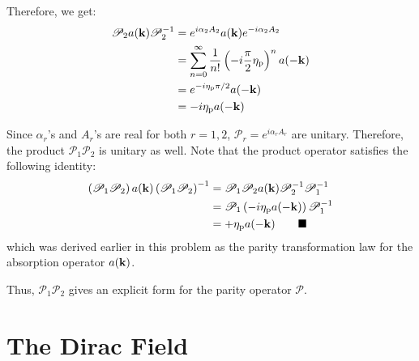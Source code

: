 \documentclass[letterpaper,12pt]{article}
\newenvironment{problem}{\subsection{}\begin{adjustwidth}{0.25in}{}\vspace{-\baselineskip}}{\end{adjustwidth}}
\newenvironment{subproblem}{\subsubsection{}\begin{adjustwidth}{0.4in}{}\vspace{-\baselineskip}}{\end{adjustwidth}}
\newcommand{\done}{\tag*{$\blacksquare$}}
\begin{document}
\begin{problem}
\begin{subproblem}
	Therefore, we get:
	\begin{align*}
		\mathscr{P}_2 a(\vb{k}) \mathscr{P}_2^{-1}
		&= e^{i\alpha_2A_2} a(\vb{k}) e^{-i\alpha_2A_2}	\\
		&= \sum_{n=0}^{\infty} \frac{1}{n!} \left(-i\frac{\pi}{2}\eta_\text{p}\right)^n a(-\vb{k})	\\
		&= e^{-i\eta_\text{p}\pi/2} a(-\vb{k})	\\
		&= -i \eta_\text{p} a(-\vb{k})
	\end{align*}
\end{subproblem}

Since $\alpha_r$'s and $A_r$'s are real for both $r=1,2$, $\mathscr{P}_r = e^{i\alpha_r A_r}$ are unitary. Therefore, the product $\mathscr{P}_1 \mathscr{P}_2$ is unitary as well. Note that the product operator satisfies the following identity:
\begin{align*}
	\left(\mathscr{P}_1\mathscr{P}_2\right) a(\vb{k}) \left(\mathscr{P}_1\mathscr{P}_2\right)^{-1}
	&= \mathscr{P}_1 \mathscr{P}_2 a(\vb{k}) \mathscr{P}_2^{-1} \mathscr{P}_1^{-1}	\\
	&= \mathscr{P}_1 \left(-i\eta_\text{p}a(-\vb{k})\right) \mathscr{P}_1^{-1}	\\
	&= +\eta_\text{p} a(-\vb{k})		\done
\end{align*}
which was derived earlier in this problem as the parity transformation law for the absorption operator $a(\vb{k})$.

Thus, $\mathscr{P}_1\mathscr{P}_2$ gives an explicit form for the parity operator $\mathscr{P}$.
\end{problem}

\pagebreak



\section{The Dirac Field}
\end{document}
